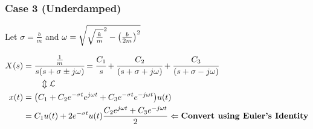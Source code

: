 \documentclass[aspectratio=169]{beamer}
\begin{document}
\begin{frame}
	\frametitle{Case 3 (Underdamped)}
	Let $\sigma = \frac{b}{m}$ and $\omega = \sqrt{\sqrt{\frac{k}{m}}^2 - \qty(\frac{b}{2m})^2}$
	
	\begin{align*}
		X(s) &= \cfrac{\frac{1}{m}}{s (s+\sigma \pm j\omega)} 
		= \cfrac{C_1}{s} + \cfrac{C_2}{(s+\sigma+j\omega)} + \cfrac{C_3}{(s+\sigma - j\omega)}\\
		& \qquad \Updownarrow \mathcal{L}\\
		x(t) &= \qty(C_1 + C_2 e^{-\sigma t}e^{j\omega t} + C_3 e^{-\sigma t} e^{-j\omega t}) u(t)\\
		&= C_1 u(t) + 2 e^{-\sigma t} u(t) \frac{C_2 e^{j\omega t} + C_3 e^{-j\omega t}}{2}
		\Leftarrow \textbf{Convert using Euler's Identity}
	\end{align*}
	


\end{frame}



	



\end{document}
